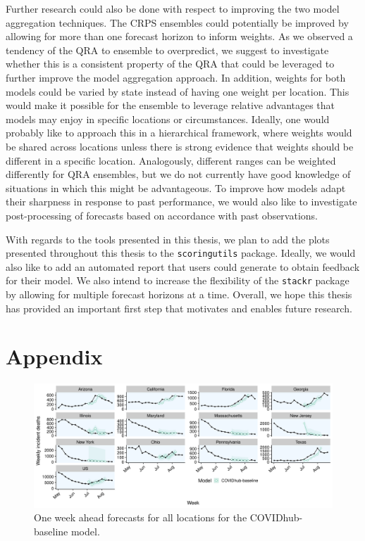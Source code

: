 \documentclass[
]{book}
\begin{document}
Further research could also be done with respect to improving the two model aggregation techniques. The CRPS ensembles could potentially be improved by allowing for more than one forecast horizon to inform weights. As we observed a tendency of the QRA to ensemble to overpredict, we suggest to investigate whether this is a consistent property of the QRA that could be leveraged to further improve the model aggregation approach. In addition, weights for both models could be varied by state instead of having one weight per location. This would make it possible for the ensemble to leverage relative advantages that models may enjoy in specific locations or circumstances. Ideally, one would probably like to approach this in a hierarchical framework, where weights would be shared across locations unless there is strong evidence that weights should be different in a specific location. Analogously, different ranges can be weighted differently for QRA ensembles, but we do not currently have good knowledge of situations in which this might be advantageous. To improve how models adapt their sharpness in response to past performance, we would also like to investigate post-processing of forecasts based on accordance with past observations.

With regards to the tools presented in this thesis, we plan to add the plots presented throughout this thesis to the \texttt{scoringutils} package. Ideally, we would also like to add an automated report that users could generate to obtain feedback for their model. We also intend to increase the flexibility of the \texttt{stackr} package by allowing for multiple forecast horizons at a time. Overall, we hope this thesis has provided an important first step that motivates and enables future research.

\hypertarget{appendix-appendix}{%
\appendix}


\hypertarget{appendix}{%
\chapter{Appendix}\label{appendix}}

\begin{figure}
\includegraphics[width=1\linewidth]{../visualisation/chapter-5-results/scenario-baseline/APPENDIX-COVIDhub-baseline-forecasts} \caption{One week ahead forecasts for all locations for the COVIDhub-baseline model.}\label{fig:predictions-baseline}
\end{figure}
\end{document}
